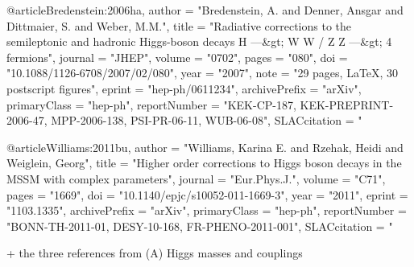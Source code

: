 @article{Bredenstein:2006ha,
      author         = "Bredenstein, A. and Denner, Ansgar and Dittmaier, S. and
                        Weber, M.M.",
      title          = "{Radiative corrections to the semileptonic and hadronic
                        Higgs-boson decays H ---&gt; W W / Z Z ---&gt; 4
                        fermions}",
      journal        = "JHEP",
      volume         = "0702",
      pages          = "080",
      doi            = "10.1088/1126-6708/2007/02/080",
      year           = "2007",
      note           = "29 pages, LaTeX, 30 postscript figures",
      eprint         = "hep-ph/0611234",
      archivePrefix  = "arXiv",
      primaryClass   = "hep-ph",
      reportNumber   = "KEK-CP-187, KEK-PREPRINT-2006-47, MPP-2006-138,
                        PSI-PR-06-11, WUB-06-08",
      SLACcitation   = "%
}

@article{Williams:2011bu,
      author         = "Williams, Karina E. and Rzehak, Heidi and Weiglein,
                        Georg",
      title          = "{Higher order corrections to Higgs boson decays in
the
                        MSSM with complex parameters}",
      journal        = "Eur.Phys.J.",
      volume         = "C71",
      pages          = "1669",
      doi            = "10.1140/epjc/s10052-011-1669-3",
      year           = "2011",
      eprint         = "1103.1335",
      archivePrefix  = "arXiv",
      primaryClass   = "hep-ph",
      reportNumber   = "BONN-TH-2011-01, DESY-10-168, FR-PHENO-2011-001",
      SLACcitation   = "%
}


+ the three references from (A) Higgs masses and couplings





